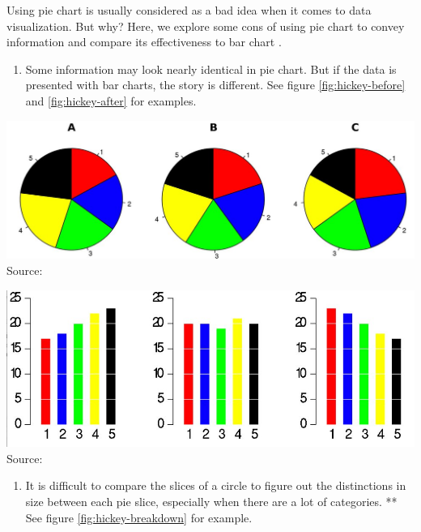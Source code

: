 \documentclass[]{book}
\providecommand{\tightlist}{%
  \setlength{\itemsep}{0pt}\setlength{\parskip}{0pt}}
\theoremstyle{definition}
\theoremstyle{definition}
\theoremstyle{definition}
\theoremstyle{remark}
\begin{document}
Using pie chart is usually considered as a bad idea when it comes to
data visualization. But why? Here, we explore some cons of using pie
chart to convey information and compare its effectiveness to bar chart
\citep{hickey-pie-worst} \citep{henry-defense-pie} \citep{quach-penny}.

\begin{enumerate}
\def\labelenumi{\arabic{enumi}.}
\tightlist
\item
  Some information may look nearly identical in pie chart. But if the
  data is presented with bar charts, the story is different. See figure
  \ref{fig:hickey-before} and \ref{fig:hickey-after} for examples.
\end{enumerate}

\includegraphics{images/hickey-before.jpg} Source:
\citep{hickey-pie-worst}

\includegraphics{images/hickey-after.jpg} Source:
\citep{hickey-pie-worst}

\begin{enumerate}
\def\labelenumi{\arabic{enumi}.}
\setcounter{enumi}{1}
\tightlist
\item
  It is difficult to compare the slices of a circle to figure out the
  distinctions in size between each pie slice, especially when there are
  a lot of categories. ** See figure \ref{fig:hickey-breakdown} for
  example.
\end{enumerate}
\end{document}
